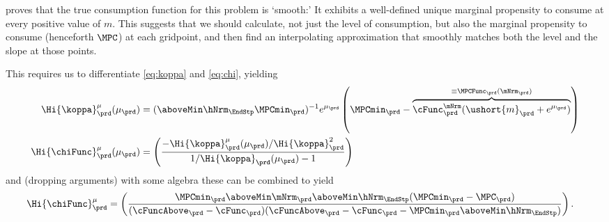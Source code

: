 \documentclass[\econtexRoot/SolvingMicroDSOPs]{subfiles}
\begin{document}
\cite{BufferStockTheory} proves that the true consumption function for
this problem
is `smooth:' It
exhibits a well-defined unique marginal propensity to consume at every
positive value of $m$.  This suggests that we should calculate, not
just the level of consumption, but also the marginal propensity to
consume (henceforth $\MPC$) at each gridpoint, and then find an
interpolating approximation that smoothly matches both the level and the slope
at those points.

This requires us to differentiate \eqref{eq:koppa} and \eqref{eq:chi}, yielding
\begin{equation}\begin{gathered}\begin{aligned}
      \Hi{\koppa}_{\prd}^{\mu}(\mu_{\prd})   & = (\aboveMin \hNrm_{\EndStp} \MPCmin_{\prd})^{-1}e^{\mu_{\prd}}\left(\MPCmin_{\prd}-\overbrace{\cFunc^{\mNrm}_{\prd}(\ushort{m}_{\prd}+e^{\mu_{\prd}})}^{\equiv \MPCFunc_{\prd}(\mNrm_{\prd})}\right)  \label{eq:koppaPrime}
      \\ \Hi{\chiFunc}_{\prd}^{\mu}(\mu_{\prd})  & = \left(\frac{-\Hi{\koppa}_{\prd}^{\mu}(\mu_{\prd})/\Hi{\koppa}_{\prd}^{2}}{1/\Hi{\koppa}_{\prd}(\mu_{\prd})-1}\right)
    \end{aligned}\end{gathered}\end{equation}
and (dropping arguments) with some algebra these can be combined to yield
\begin{equation}\begin{gathered}\begin{aligned}
      \Hi{\chiFunc}_{\prd}^{\mu}  & = \left(\frac{\MPCmin_{\prd} \aboveMin \mNrm_{\prd} \aboveMin \hNrm_{\EndStp} (\MPCmin_{\prd}-\MPC_{\prd})}
        {(\cFuncAbove_{\prd}-\cFunc_{\prd})(\cFuncAbove_{\prd}-\cFunc_{\prd} - \MPCmin_{\prd} \aboveMin \hNrm_{\EndStp})}\right).
    \end{aligned}\end{gathered}\end{equation}
\end{document}
